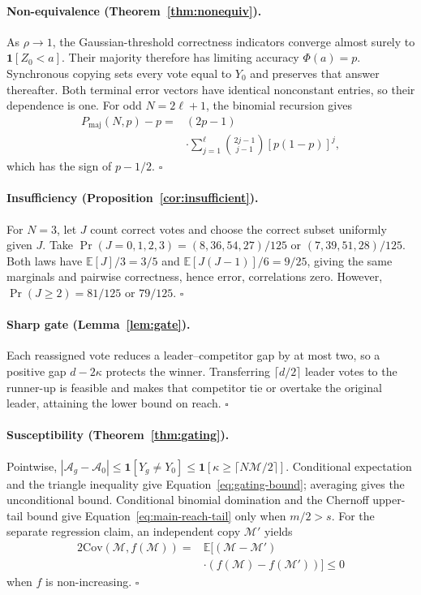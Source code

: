 \documentclass[11pt,a4paper]{article}
\theoremstyle{definition}
\newcommand{\Marg}{\mathcal{M}}
\begin{document}
\paragraph{Non-equivalence (Theorem~\ref{thm:nonequiv}).}
As $\rho\to1$, the Gaussian-threshold correctness indicators converge
almost surely to $\mathbf1[Z_0<a]$. Their majority therefore has limiting
accuracy $\Phi(a)=p$. Synchronous copying sets every vote equal to $Y_0$
and preserves that answer thereafter. Both terminal error vectors have
identical nonconstant entries, so their dependence is one. For odd
$N=2\ell+1$, the binomial recursion gives
\begin{equation*}
\begin{split}
P_{\mathrm{maj}}(N,p)-p
={}&(2p-1)\\
&\cdot\sum_{j=1}^{\ell}\binom{2j-1}{j-1}[p(1-p)]^j,
\end{split}
\end{equation*}
which has the sign of $p-1/2$. \hfill$\square$

\paragraph{Insufficiency (Proposition~\ref{cor:insufficient}).}
For $N=3$, let $J$ count correct votes and choose the correct subset
uniformly given $J$. Take
$\Pr(J=0,1,2,3)=(8,36,54,27)/125$ or $(7,39,51,28)/125$.
Both laws have $\mathbb E[J]/3=3/5$ and
$\mathbb E[J(J-1)]/6=9/25$, giving the same marginals and pairwise
correctness, hence error, correlations zero. However,
$\Pr(J\ge2)=81/125$ or $79/125$. \hfill$\square$

\paragraph{Sharp gate (Lemma~\ref{lem:gate}).}
Each reassigned vote reduces a leader--competitor gap by at most two, so
a positive gap $d-2\kappa$ protects the winner. Transferring
$\lceil d/2\rceil$ leader votes to the runner-up is feasible and makes
that competitor tie or overtake the original leader, attaining the lower
bound on reach. \hfill$\square$

\paragraph{Susceptibility (Theorem~\ref{thm:gating}).}
Pointwise,
$|\mathcal A_g-\mathcal A_0|\le\mathbf1[Y_g\neq Y_0]
\le\mathbf1[\kappa\ge\lceil N\Marg/2\rceil]$.
Conditional expectation and the triangle inequality give
Equation~\ref{eq:gating-bound}; averaging gives the unconditional bound.
Conditional binomial domination and the Chernoff upper-tail bound give
Equation~\ref{eq:main-reach-tail} only when $m/2>s$.
For the separate regression claim, an independent copy $\Marg'$ yields
\begin{equation*}
\begin{split}
2\mathrm{Cov}(\Marg,f(\Marg))
={}&\mathbb E\big[(\Marg-\Marg')\\
&\cdot(f(\Marg)-f(\Marg'))\big]\le0
\end{split}
\end{equation*}
when $f$ is non-increasing. \hfill$\square$
\end{document}
